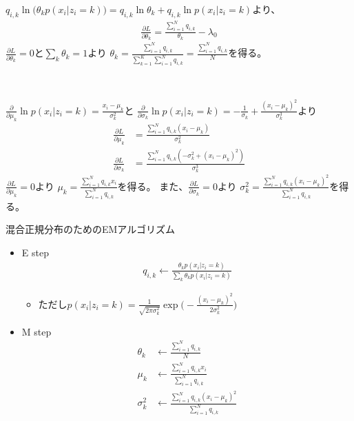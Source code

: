\documentclass[aspectratio=169,unicode,dvipdfmx,14pt]{beamer}
\begin{document}
\begin{frame}
\FontMath
$q_{i,k} \ln \big( \theta_k p(x_i | z_i = k) \big)
= q_{i,k} \ln \theta_k + q_{i,k} \ln p(x_i | z_i = k)$より、
\begin{align}
\frac{\partial L}{\partial \theta_k}
= \frac{ \sum_{i=1}^N  q_{i,k} }{ \theta_k } - \lambda_0
\end{align}
$\frac{\partial L}{\partial \theta_k} = 0$と$\sum_k \theta_k = 1$より
$\theta_k = \frac{ \sum_{i=1}^N q_{i,k} }{ \sum_{k=1}^K \sum_{i=1}^N q_{i,k} } = \frac{ \sum_{i=1}^N q_{i,k} }{ N }$を得る。

\

$\frac{\partial }{\partial \mu_k} \ln p(x_i | z_i = k) = \frac{ x_i - \mu_k }{\sigma_k^2}$と
$\frac{\partial }{\partial \sigma_k} \ln p(x_i | z_i = k) = - \frac{1}{\sigma_k} + \frac{ (x_i - \mu_k)^2 }{\sigma_k^3}$より
\begin{align}
\frac{\partial L}{\partial \mu_k}
& = \frac{ \sum_{i=1}^N q_{i,k} (x_i - \mu_k) }{\sigma_k^2} \\
\frac{\partial L}{\partial \sigma_k}
& = \frac{ \sum_{i=1}^N q_{i,k} ( - \sigma_k^2 + (x_i - \mu_k)^2 ) }{\sigma_k^3}
\end{align}
$\frac{\partial L}{\partial \mu_k} = 0$より
$\mu_k = \frac{ \sum_{i=1}^N q_{i,k} x_i }{ \sum_{i=1}^N q_{i,k} }$を得る。
また、$\frac{\partial L}{\partial \sigma_k} = 0$より
$\sigma_k^2 = \frac{ \sum_{i=1}^N q_{i,k} (x_i - \mu_k)^2 }{ \sum_{i=1}^N q_{i,k} }$を得る。
\end{frame}

\begin{frame}{混合正規分布のためのEMアルゴリズム}
\vspace{-.1in}
\begin{itemize}
\item E step
\vspace{-.1in}
\begin{align}
q_{i,k} \leftarrow \frac{ \theta_k p(x_i | z_i = k) }{ \sum_k \theta_k p(x_i | z_i = k) }
\label{eq:EM_q}
\end{align}
\vspace{-.1in}
\begin{itemize}
\item[] ただし$p(x_i | z_i = k) = \frac{1}{\sqrt{2\pi\sigma_k^2}} \exp\big( - \frac{ (x_i - \mu_k)^2 }{2\sigma_k^2} \big)$
\end{itemize}
\vspace{-.1in}
\item M step
\vspace{-.1in}
\begin{align}
\theta_k & \leftarrow \frac{ \sum_{i=1}^N q_{i,k} }{ N } \\
\mu_k & \leftarrow \frac{ \sum_{i=1}^N q_{i,k} x_i }{ \sum_{i=1}^N q_{i,k} } \\
\sigma_k^2 & \leftarrow \frac{ \sum_{i=1}^N q_{i,k} (x_i - \mu_k)^2 }{ \sum_{i=1}^N q_{i,k} }
\end{align}
\end{itemize}
\end{frame}
\end{document}
